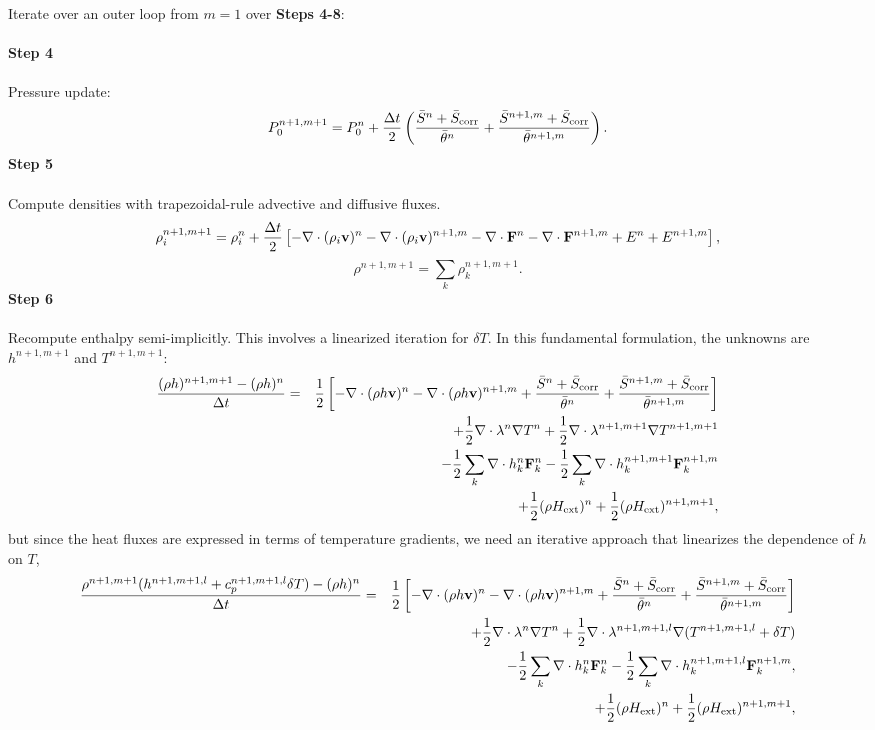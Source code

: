 \documentclass[final]{siamltex}
\def\Fb {{\bf F}}
\def\vb {{\bf v}}
\def\Hext {H_{\rm ext}}
\def\half   {\frac{1}{2}}
\begin{document}
Iterate over an outer loop from $m=1$ over {\bf Steps 4-8}:\\ \\
{\bf Step 4}\\ \\
Pressure update:
\begin{equation}
P_0^{n+1,m+1} = P_0^n + \frac{\Delta t}{2}\left(\frac{\bar{S}^n + \bar{S}_{\rm corr}}{\bar{\theta}^n} + \frac{\bar{S}^{n+1,m} + \bar{S}_{\rm corr}}{\bar{\theta}^{n+1,m}}\right).
\end{equation}
{\bf Step 5}\\ \\
Compute densities with trapezoidal-rule advective and diffusive fluxes.
\begin{equation}
\rho_i^{n+1,m+1} = \rho_i^n + \frac{\Delta t}{2}\left[-\nabla\cdot(\rho_i\vb)^n -\nabla\cdot(\rho_i\vb)^{n+1,m} - \nabla\cdot\Fb^n - \nabla\cdot\Fb^{n+1,m} + E^n + E^{n+1,m}\right],
\end{equation}
\begin{equation}
\rho^{n+1,m+1} = \sum_k\rho_k^{n+1,m+1}.
\end{equation}
{\bf Step 6}\\ \\
Recompute enthalpy semi-implicitly.  This involves a linearized iteration 
for $\delta T$.  In this fundamental formulation, the unknowns 
are $h^{n+1,m+1}$ and $T^{n+1,m+1}$:
\begin{eqnarray}
\frac{(\rho h)^{n+1,m+1} - (\rho h)^n}{\Delta t} &=& \half\left[-\nabla\cdot(\rho h\vb)^n -\nabla\cdot(\rho h\vb)^{n+1,m} + \frac{\bar{S}^n + \bar{S}_{\rm corr}}{\bar{\theta}^n} + \frac{\bar{S}^{n+1,m}+ \bar{S}_{\rm corr}}{\bar{\theta}^{n+1,m}}\right]\nonumber\\
&&+ \half\nabla\cdot\lambda^n\nabla T^n + \half\nabla\cdot\lambda^{n+1,m+1}\nabla T^{n+1,m+1}\nonumber\\
&&- \half\sum_k\nabla\cdot h_k^n\Fb_k^n - \half\sum_k\nabla\cdot h_k^{n+1,m+1}\Fb_k^{n+1,m}\nonumber\\
&&+ \half(\rho\Hext)^n + \half(\rho\Hext)^{n+1,m+1},
\end{eqnarray}
but since the heat fluxes are expressed in terms of temperature gradients, we
need an iterative approach that linearizes the dependence of $h$ on $T$,
\begin{eqnarray}
\frac{\rho^{n+1,m+1}(h^{n+1,m+1,l} + c_p^{n+1,m+1,l}\delta T) - (\rho h)^n}{\Delta t} &=& \half\left[-\nabla\cdot(\rho h\vb)^n -\nabla\cdot(\rho h\vb)^{n+1,m} + \frac{\bar{S}^n + \bar{S}_{\rm corr}}{\bar{\theta}^n} + \frac{\bar{S}^{n+1,m}+ \bar{S}_{\rm corr}}{\bar{\theta}^{n+1,m}}\right]\nonumber\\
&&\hspace{-1in} + \half\nabla\cdot\lambda^n\nabla T^n + \half\nabla\cdot\lambda^{n+1,m+1,l}\nabla(T^{n+1,m+1,l} + \delta T)\nonumber\\
&&\hspace{-1in} - \half\sum_k\nabla\cdot h_k^n \Fb_k^n - \half\sum_k\nabla\cdot h_k^{n+1,m+1,l} \Fb_k^{n+1,m},\nonumber\\
&&\hspace{-1in} + \half(\rho\Hext)^n + \half(\rho\Hext)^{n+1,m+1},
\end{eqnarray}
\end{document}
